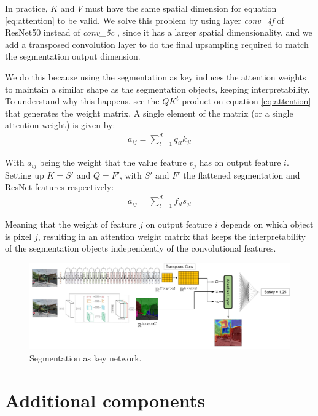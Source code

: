 In practice, $K$ and $V$ must have the same spatial dimension for equation \ref{eq:attention} to be valid.
We solve this problem by using layer \textit{conv\_4f} of ResNet50 instead of \textit{conv\_5c}  , since it has a
larger spatial dimensionality, and we add a transposed convolution layer \cite{noh_deconv} to do the final upsampling
required to match the segmentation output dimension.

We do this because using the segmentation as key induces the attention weights to maintain a similar shape as the segmentation objects,
keeping interpretability. To understand why this happens, see the $QK^t$ product on equation \ref{eq:attention} that generates the
weight matrix. A single element of the matrix (or a single attention weight) is given by:
\begin{align}
	a_{ij} = \sum_{l=1}^d q_{il}k_{jl}
\end{align}

With $a_{ij}$ being the weight that the value feature $v_j$ has on output feature $i$. Setting up $K=S'$  and $Q=F'$, with $S'$ and $F'$ the flattened segmentation and ResNet features
respectively:
\begin{align}
	a_{ij} = \sum_{l=1}^d f_{il}s_{jl}
\end{align}

Meaning that the weight of feature $j$ on output feature $i$ depends on which object is pixel $j$, resulting in an attention weight matrix
that keeps the  interpretability of the segmentation objects independently of the convolutional features.

\begin{figure}[ht]
	\begin{center}
	\includegraphics[width=1\textwidth]{./figures/segattn.png}
	\caption[Segmentation as key network]{Segmentation as key network.}
	\label{fig:segrank_1}
	\end{center}
\end{figure}

\section{Additional components}
\label{sec:adds}
